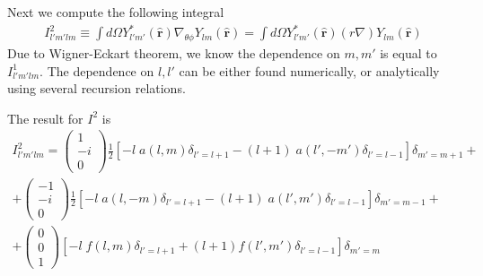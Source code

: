 \documentclass[aps,prb,floatfix,epsfig,singlecolumn,showpacs,preprintnumbers]{revtex4}
\renewcommand{\vr}{{\mathbf{r}}}
\begin{document}
Next we compute the following integral
\begin{eqnarray}
I^2_{l'm'lm}\equiv\int d\Omega Y^*_{l'm'}(\hat{\vr}) \nabla_{\theta\phi} Y_{lm}(\hat{\vr})=
\int d\Omega Y^*_{l'm'}(\hat{\vr}) (r\nabla)   Y_{lm}(\hat{\vr})
\end{eqnarray}
Due to Wigner-Eckart theorem, we know the dependence on $m,m'$ is
equal to $I^1_{l'm'lm}$. The
dependence on $l,l'$ can be either found numerically, or analytically
using several recursion relations.

The result for $I^2$ is
\begin{eqnarray}
I^2_{l'm'lm}=
\left(
\begin{array}{c}
1\\
-i\\
0
\end{array}
\right)
\frac{1}{2}\left[
-l\; a(l,m)\delta_{l'=l+1}-
(l+1)\; a(l',-m')\delta_{l'=l-1}
\right]\delta_{m'=m+1}
+\\+
\left(
\begin{array}{c}
-1\\
-i\\
0
\end{array}
\right)
\frac{1}{2}
\left[-l\; a(l,-m) \delta_{l'=l+1}-(l+1)\; a(l',m')\delta_{l'=l-1}
\right]\delta_{m'=m-1} 
+\\+
\left(
\begin{array}{c}
0\\
0\\
1
\end{array}
\right)
\left[-l\; f(l,m) \delta_{l'=l+1}
+
(l+1) f(l',m')\delta_{l'=l-1}
\right]\delta_{m'=m}
\end{eqnarray}
\end{document}
